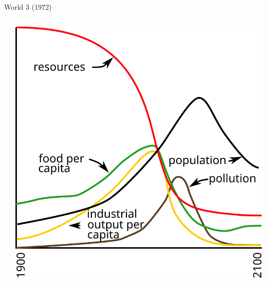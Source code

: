 \documentclass{beamer}
\begin{document}
\begin{frame}{World 3 (1972)}
\begin{columns}
\begin{column}{0.5\textwidth}
\end{column}

\begin{column}{0.5\textwidth}  
\includegraphics[scale=0.2]{images/limits-to-growth-figure.png}
\end{column}
\end{columns}
\end{frame}
\end{document}
